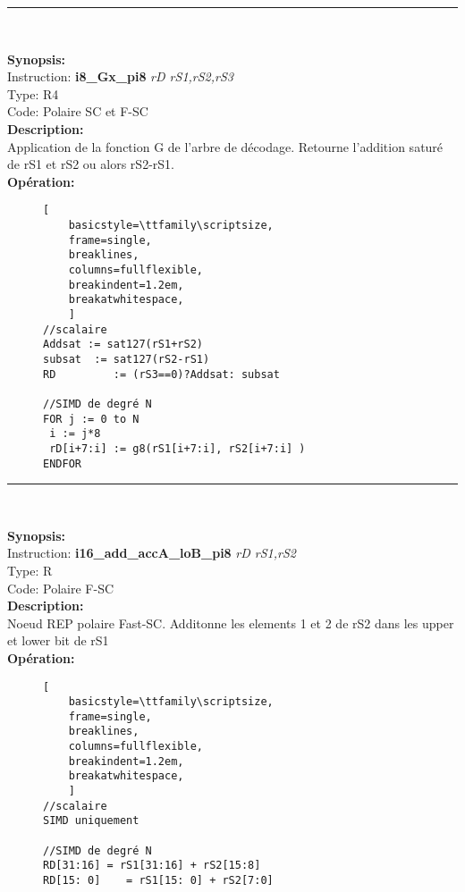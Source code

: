 \rule{8cm}{0.4pt}\\
{\scriptsize
\textbf{Synopsis:}\\
Instruction: \textbf{i8\_Gx\_pi8 } \textit{rD rS1,rS2,rS3}\\
Type: R4\\
Code: Polaire SC et F-SC\\
\textbf{Description:}\\
Application de la fonction G de l'arbre de décodage. Retourne l’addition saturé de rS1 et rS2 ou alors rS2-rS1.\\
\textbf{Opération:}\\
    \begin{figure}[H]
    \begin{lstlisting}[
    basicstyle=\ttfamily\scriptsize,
    frame=single,
    breaklines,
    columns=fullflexible,
    breakindent=1.2em,
    breakatwhitespace,
    ]
//scalaire
Addsat := sat127(rS1+rS2)
subsat  := sat127(rS2-rS1)
RD         := (rS3==0)?Addsat: subsat
    
//SIMD de degré N
FOR j := 0 to N    
 i := j*8    
 rD[i+7:i] := g8(rS1[i+7:i], rS2[i+7:i] ) 
ENDFOR
\end{lstlisting}
\end{figure}
}
\rule{8cm}{0.4pt}\\
{\scriptsize
\textbf{Synopsis:}\\
Instruction: \textbf{i16\_add\_accA\_loB\_pi8 } \textit{rD rS1,rS2}\\
Type: R\\
Code: Polaire F-SC\\
\textbf{Description:}\\
Noeud REP polaire Fast-SC. Additonne les elements 1 et 2 de rS2 dans les upper et lower bit de rS1\\
\textbf{Opération:}\\
    \begin{figure}[H]
    \begin{lstlisting}[
    basicstyle=\ttfamily\scriptsize,
    frame=single,
    breaklines,
    columns=fullflexible,
    breakindent=1.2em,
    breakatwhitespace,
    ]
//scalaire
SIMD uniquement 
    
//SIMD de degré N
RD[31:16] = rS1[31:16] + rS2[15:8]
RD[15: 0]    = rS1[15: 0] + rS2[7:0] 
\end{lstlisting}
\end{figure}
}
